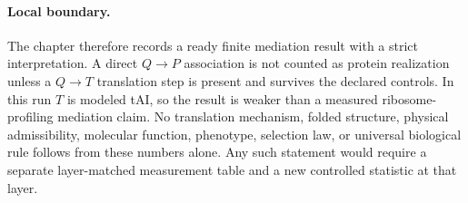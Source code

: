 \paragraph{Local boundary.}
The chapter therefore records a ready finite mediation result with a strict interpretation.  A direct $Q\to P$ association is not counted as protein realization unless a $Q\to T$ translation step is present and survives the declared controls.  In this run $T$ is modeled tAI, so the result is weaker than a measured ribosome-profiling mediation claim.  No translation mechanism, folded structure, physical admissibility, molecular function, phenotype, selection law, or universal biological rule follows from these numbers alone.  Any such statement would require a separate layer-matched measurement table and a new controlled statistic at that layer.